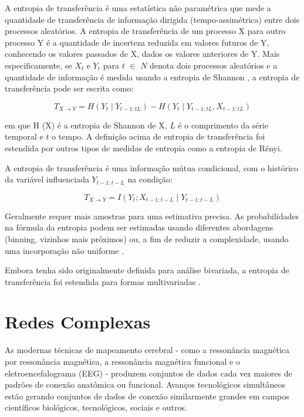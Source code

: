\documentclass[
	12pt,				%
	openright,			%
	twoside,			%
	a4paper,			%
	english,			%
	french,				%
	spanish,			%
	brazil				%
	]{abntex2}
\begin{document}
A entropia de transferência é uma estatística não paramétrica que mede a quantidade de transferência de informação dirigida (tempo-assimétrica) entre dois processos aleatórios. A entropia de transferência de um processo X para outro processo Y é a quantidade de incerteza reduzida em valores futuros de Y, conhecendo os valores passados de X, dados os valores anteriores de Y. Mais especificamente, se $ X_ {t}$ e $Y_ {t}$ para $ t$ $ \in $ ${N}$ denota dois processos aleatórios e a quantidade de informação é medida usando a entropia de Shannon \cite{shannon1948mathematical}, a entropia de transferência pode ser escrita como:

\begin{equation}
    T_ {X \rightarrow Y} = H \left (Y_ {t} \mid Y_ {t-1: tL} \right) -H \left (Y_ {t} \mid Y_ {t-1: tL }, X_ {t-1: tL} \right)
\end{equation}

em que H (X) é a entropia de Shannon de X, $L$ é o comprimento da série temporal e $t$ o tempo. A definição acima de entropia de transferência foi estendida por outros tipos de medidas de entropia como a entropia de Rényi. 

A entropia de transferência é uma informação mútua condicional, com o histórico da variável influenciada $Y_ {t-1: t-L}$ na condição:

\begin{equation}
T_ {X \rightarrow Y} = I (Y_ {t}; X_ {t-1: t-L} \mid Y_ {t-1: t-L})
\end{equation}

Geralmente requer mais amostras para uma estimativa precisa. As probabilidades na fórmula da entropia podem ser estimadas usando diferentes abordagens (binning, vizinhos mais próximos) ou, a fim de reduzir a complexidade, usando uma incorporação não uniforme \cite{juliana}. 

Embora tenha sido originalmente definida para análise bivariada, a entropia de transferência foi estendida para formas multivariadas \cite{kraskov2004synchronization}.


\section{Redes Complexas}

As modernas técnicas de mapeamento cerebral - como a ressonância magnética por ressonância magnética, a ressonância magnética funcional e o eletroencefalograma (EEG)  - produzem conjuntos de dados cada vez maiores de padrões de conexão anatômica ou funcional. Avanços tecnológicos simultâneos estão gerando conjuntos de dados de conexão similarmente grandes em campos científicos biológicos, tecnológicos, sociais e outros.
\end{document}

